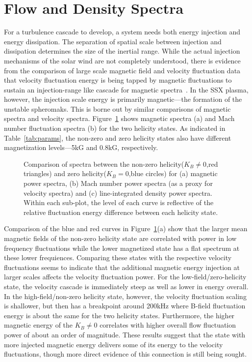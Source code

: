 \documentclass[manuscript]{aastex}
\begin{document}
\section{Flow and Density Spectra}\label{sec:flowdens}

For a turbulence cascade to develop, a system needs both energy injection and energy dissipation. The separation of spatial scale between injection and dissipation determines the size of the inertial range. While the actual injection mechanisms of the solar wind are not completely understood, there is evidence from the comparison of large scale magnetic field and velocity fluctuation data that velocity fluctuation energy is being tapped by magnetic fluctuations to sustain an injection-range like cascade for magnetic spectra~\citep{rob10}. In the SSX plasma, however, the injection scale energy is primarily magnetic---the formation of the unstable spheromaks. This is borne out by similar comparisons of magnetic spectra and velocity spectra. Figure~\ref{fig:BvsFlow} shows magnetic spectra (a) and Mach number fluctuation spectra (b) for the two helicity states. As indicated in Table~\ref{tab:params}, the non-zero and zero helicity states also have different magnetization levels---5kG and 0.8kG, respectively.

\begin{figure}
\caption{\label{fig:BvsFlow} Comparison of spectra between the non-zero helicity($K_{B}\neq 0$,red triangles) and zero helicity($K_{B}=0$,blue circles) for (a) magnetic power spectra, (b) Mach number power spectra (as a proxy for velocity spectra) and (c) line-integrated density power spectra. Within each sub-plot, the level of each curve is reflective of the relative fluctuation energy difference between each helicity state.}
\end{figure}

Comparison of the blue and red curves in Figure~\ref{fig:BvsFlow}(a) show that the larger mean magnetic fields of the non-zero helicity state are correlated with power in low frequency fluctuations while the lower magnetized state has a flat spectrum at these lower frequiences. Comparing these states with the respective velocity fluctuations seems to indicate that the additional magnetic energy injection at larger scales affects the velocity fluctuation power. For the low-field/zero-helicity state, the velocity cascade is immediately steep as well as lower in energy overall. In the high-field/non-zero helicity state, however, the velocity fluctuation scaling is shallower, but then has a breakpoint around 200kHz where B-field fluctuation energy is about the same for the two helicity states. Furthermore, the higher magnetic energy of the $K_{B}\neq 0$ correlates with higher overall flow fluctuation power of about an order of magnitude. These results suggest that the state with more injected magnetic energy delivers some of its energy to the velocity fluctuations, though more direct evidence of this connection is still being sought.
\end{document}
